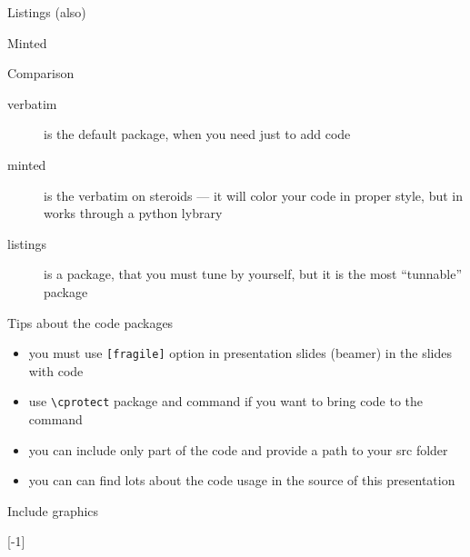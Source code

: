 \begin{frame}[fragile]{Listings (also)}\relax

\cprotect{}

 
\end{frame}

\begin{frame}[fragile]{Minted}\relax

\cprotect{}
\end{frame}

\begin{frame}[fragile]{Comparison}\relax
    \begin{description}
         \item[verbatim] is the default package, when you need just to add code 
         \item[minted] is the verbatim on steroids --- it will color your code in proper style, but in works through a python lybrary
         \item[listings] is a package, that you must tune by yourself, but it is the most ``tunnable'' package
    \end{description}
    
\end{frame}

\begin{frame}[fragile]{Tips about the code packages}\relax
    \begin{itemize}
         \item you must use {\csk \verb|[fragile]|} option in presentation slides (beamer) in the slides with code 
         \item use {\csk \verb|\cprotect|} package and command if you want to bring code to the command
         \item you can include only part of the code and provide a path to your src folder
         \item you can can find lots about the code usage in the source of this presentation  
    \end{itemize}
\end{frame}

\begin{frame}[fragile]{Include graphics}\relax
     \cprotect{}

[-1]
\end{frame}

